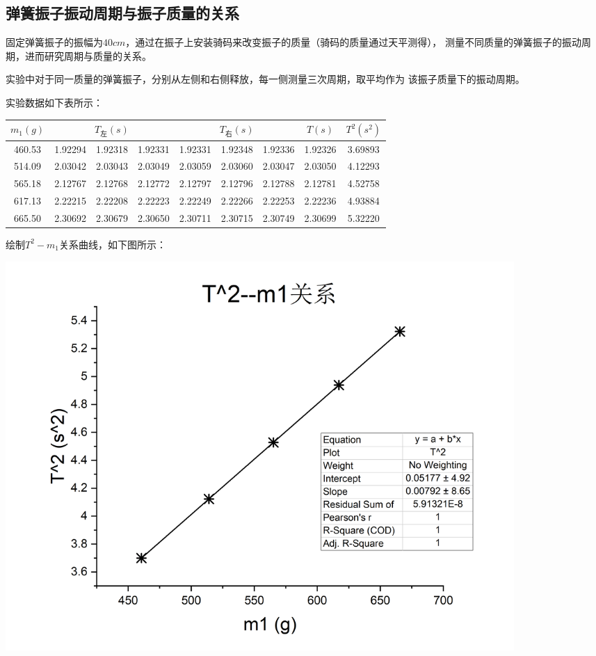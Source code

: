 \documentclass{article}
\begin{document}
    \subsection{弹簧振子振动周期与振子质量的关系}

    固定弹簧振子的振幅为$40cm$，通过在振子上安装骑码来改变振子的质量（骑码的质量通过天平测得），
    测量不同质量的弹簧振子的振动周期，进而研究周期与质量的关系。

    实验中对于同一质量的弹簧振子，分别从左侧和右侧释放，每一侧测量三次周期，取平均作为
    该振子质量下的振动周期。

    实验数据如下表所示：

    \begin{center}
        \begin{tabular}{|c|c|c|c|c|c|c|c|c|}
            \hline
            $m_1(g)$ & \multicolumn{3}{|c|}{$T_{\text{左}}(s)$} & \multicolumn{3}{|c|}{$T_{\text{右}}(s)$} & $T(s)$ & $T^2(s^2)$\\
            \hline
            460.53 & 1.92294 & 1.92318 & 1.92331 & 1.92331 & 1.92348 & 1.92336 & 1.92326 & 3.69893\\
            \hline
            514.09 & 2.03042 & 2.03043 & 2.03049 & 2.03059 & 2.03060 & 2.03047 & 2.03050 & 4.12293\\
            \hline
            565.18 & 2.12767 & 2.12768 & 2.12772 & 2.12797 & 2.12796 & 2.12788 & 2.12781 & 4.52758\\
            \hline
            617.13 & 2.22215 & 2.22208 & 2.22223 & 2.22249 & 2.22266 & 2.22253 & 2.22236 & 4.93884\\
            \hline
            665.50 & 2.30692 & 2.30679 & 2.30650 & 2.30711 & 2.30715 & 2.30749 & 2.30699 & 5.32220\\
            \hline
        \end{tabular}
    \end{center}

    绘制$T^2-m_1$关系曲线，如下图所示：
    
    \includegraphics[width=0.85\textwidth]{T^2--m1.jpg}
\end{document}
